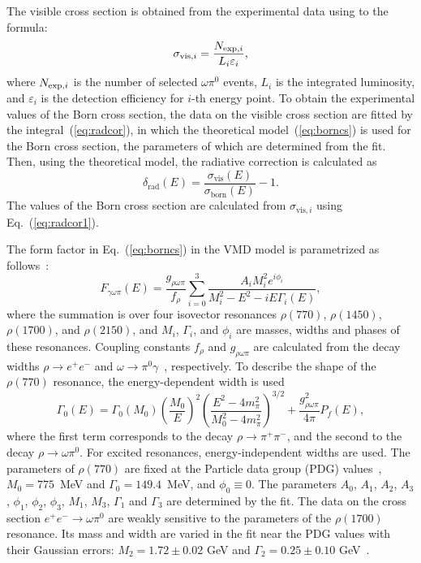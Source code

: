 \documentclass[twocolumn,aps,prd,floatfix,nofootinbib,superscriptaddress]{revtex4-2}
\begin{document}
The visible cross section is obtained from the experimental data using to the formula:
\begin{equation}
\label{eq:viscs}
	\sigma_{\text{vis},i} = \frac{N_{{\rm exp},i}}{L_i \varepsilon_i},
\end{equation}
where $N_{{\rm exp},i}$ is the number of selected $\omega\pi^0$ events, $L_i$ is the integrated luminosity, and $\varepsilon_i$ is the detection efficiency for $i$-th energy point.
To obtain the experimental values of the Born cross section, the data on the visible cross section are fitted by the integral~(\ref{eq:radcor}), in which the theoretical model~(\ref{eq:borncs}) is used for the Born cross section, the parameters of which are determined from the fit.
Then, using the theoretical model, the radiative correction is calculated as
\begin{equation}
\label{eq:radcordef}
	\delta_\text{rad}(E) = \frac{ \sigma_\text{vis}(E) }{ \sigma_\text{born}(E) } - 1.
\end{equation}
The values of the Born cross section are calculated from $\sigma_{\text{vis},i}$ using Eq.~(\ref{eq:radcor1}).

The form factor in Eq.~(\ref{eq:borncs}) in the VMD model is parametrized as follows~\cite{snd2000a,kardopo13}:
\begin{equation}
\label{eq:formfactor}
	F_{\gamma\omega\pi}(E) = \frac{g_{\rho\omega\pi}}{f_\rho}
	\sum\limits_{i=0}^3 \frac{A_i M_i^2 e^{i \phi_i}}{M_i^2 - E^2 - iE\Gamma_i(E)},
\end{equation}
where the summation is over four isovector resonances $\rho(770)$, $\rho(1450)$, $\rho(1700)$, and $\rho(2150)$, and $M_i$, $\Gamma_i$, and $ \phi_i$ are masses, widths and phases of these resonances.
Coupling constants $f_\rho$ and $g_{\rho\omega\pi}$ are calculated from the decay widths \( \rho \to e^+e^- \) and \( \omega \to \pi^0\gamma \)~\cite{pdg}, respectively.
To describe the shape of the $\rho(770)$ resonance, the energy-dependent width is used
\begin{equation}
\label{eq:wrho}
	\Gamma_0(E) = \Gamma_0(M_0)\left( \frac{M_0}{E}\right)^{2}
		\left( \frac{E^2 - 4 m_\pi^2}{M_0^2 - 4 m_\pi^2} \right)^{3/2} +
		\frac{g_{\rho\omega\pi}^2}{4\pi} P_f(E),
\end{equation}
where the first term corresponds to the decay \( \rho \to \pi^+\pi^- \), and the second to the decay \( \rho \to \omega\pi^0 \).
For excited resonances, energy-independent widths are used.
The parameters of $\rho(770)$ are fixed at the Particle data group (PDG) values~\cite{pdg}, $M_0 = 775$~MeV and $\Gamma_0 =149.4$~MeV, and $\phi_0 \equiv 0$.
The parameters $A_0$, $A_1$, $A_2$, $A_3$, $\phi_1$, $\phi_2$, $\phi_3$, $M_1$, $M_3$, $\Gamma_1$ and $\Gamma_3$ are determined by the fit.
The data on the cross section \(e^+e^- \to \omega\pi^0 \) are weakly sensitive to the parameters of the $\rho(1700)$ resonance.
Its mass and width are varied in the fit near the PDG values with their Gaussian errors: \( M_2 = 1.72 \pm 0.02 \) GeV and \( \Gamma_2 = 0.25 \pm 0.10 \) GeV~\cite{pdg}.
\end{document}
